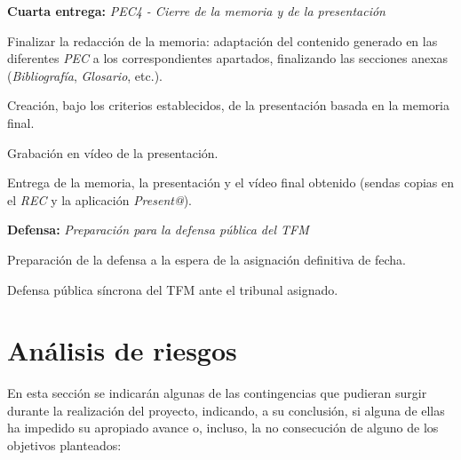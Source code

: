\documentclass[IB,BIB]{TFUOC}%
\begin{document}
\begin{todolist}
  \item \textbf{Cuarta entrega:} \textit{PEC4 - Cierre de la memoria y de la presentación}
  \begin{todolist}
  \item Finalizar la redacción de la memoria: adaptación del contenido generado en las diferentes \textit{PEC} a los correspondientes apartados, finalizando las secciones anexas (\textit{Bibliografía}, \textit{Glosario}, etc.).
  \item Creación, bajo los criterios establecidos, de la presentación basada en la memoria final.
  \item Grabación en vídeo de la presentación.
  \item Entrega de la memoria, la presentación y el vídeo final obtenido (sendas copias en el \textit{REC} y la aplicación \textit{Present@}).
  \end{todolist}
\end{todolist}

\begin{todolist}
  \item \textbf{Defensa:} \textit{Preparación para la defensa pública del TFM}
  \begin{todolist}
  \item Preparación de la defensa a la espera de la asignación definitiva de fecha.
  \item Defensa pública síncrona del TFM ante el tribunal asignado.
  \end{todolist}
\end{todolist}

\normalsize


\section{Análisis de riesgos}
\label{sec:Análisis de riesgos}

En esta sección se indicarán algunas de las contingencias que pudieran surgir durante la realización del proyecto, indicando, a su conclusión, si alguna de ellas ha impedido su apropiado avance o, incluso, la no consecución de alguno de los objetivos planteados:

\footnotesize
\end{document}
